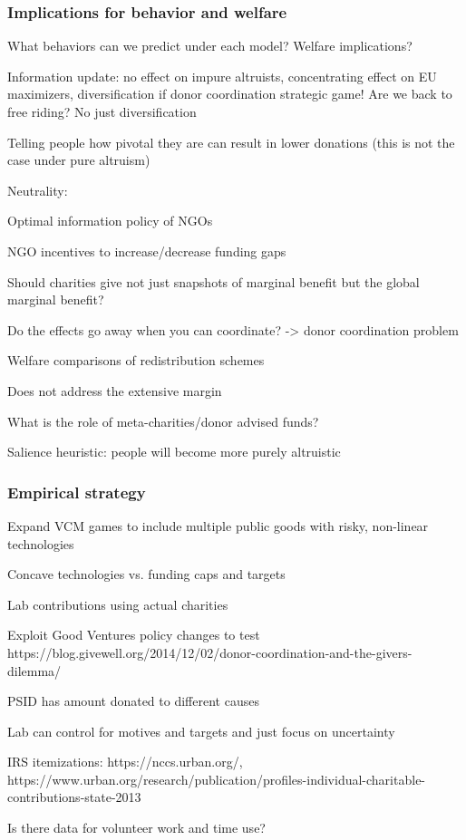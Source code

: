 \documentclass[aspectratio=169]{beamer}
\newenvironment{wideitemize}{\itemize\addtolength{\itemsep}{10pt}}{\enditemize}
\begin{document}
\begin{frame}[fragile] \frametitle{Implications for behavior and welfare}

    What behaviors can we predict under each model? Welfare implications?

    \begin{wideitemize}
        \item Information update: no effect on impure altruists, concentrating effect on EU maximizers, diversification if donor coordination strategic game! Are we back to free riding? No just diversification
        \item Telling people how pivotal they are can result in lower donations (this is not the case under pure altruism)
        \item Neutrality:
        \item Optimal information policy of NGOs
        \item NGO incentives to increase/decrease funding gaps
        \item Should charities give not just snapshots of marginal benefit but the global marginal benefit?
        \item Do the effects go away when you can coordinate? -> donor coordination problem
        \item Welfare comparisons of redistribution schemes
        \item Does not address the extensive margin
        \item What is the role of meta-charities/donor advised funds?
        \item Salience heuristic: people will become more purely altruistic
    \end{wideitemize}

\end{frame}

\begin{frame}[fragile] \frametitle{Empirical strategy}

    \begin{wideitemize}
        \item Expand VCM games to include multiple public goods with risky, non-linear technologies
        \item Concave technologies vs. funding caps and targets
        \item Lab contributions using actual charities
        \item Exploit Good Ventures policy changes to test https://blog.givewell.org/2014/12/02/donor-coordination-and-the-givers-dilemma/
        \item PSID has amount donated to different causes
        \item Lab can control for motives and targets and just focus on uncertainty
        \item IRS itemizations: https://nccs.urban.org/, https://www.urban.org/research/publication/profiles-individual-charitable-contributions-state-2013
        \item Is there data for volunteer work and time use?
    \end{wideitemize}

\end{frame}
\end{document}
